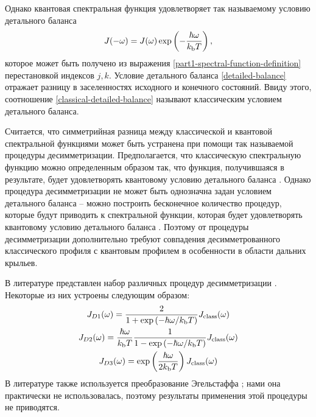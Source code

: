 Однако квантовая спектральная функция удовлетворяет так называемому условию детального баланса \cite{frommhold} 
\begin{gather}
    J(-\omega) = J(\omega) \exp \left( -\frac{\hbar \omega}{k_\text{b} T} \right), \label{detailed-balance}
\end{gather}
%
которое может быть получено из выражения \eqref{part1-spectral-function-definition} перестановкой индексов $j, k$. Условие детального баланса \eqref{detailed-balance} отражает разницу в заселенностях исходного и конечного состояний. Ввиду этого, соотношение \eqref{classical-detailed-balance} называют классическим условием детального баланса. \par
Считается, что симметрийная разница между классической и квантовой спектральной функциями может быть устранена при помощи так называемой процедуры десимметризации. Предполагается, что классическую спектральную функцию можно определенным образом  так, что функция, получившаяся в результате, будет удовлетворять квантовому условию детального баланса \cite{borysow1985phenomena}. Однако процедура десимметризации не может быть однозначна задан условием детального баланса -- можно построить бесконечное количество процедур, которые будут приводить к спектральной функции, которая будет удовлетворять квантовому условию детального баланса \cite{frommhold}. Поэтому от процедуры десимметризации дополнительно требуют совпадения десимметрованного классического профиля с квантовым профилем в особенности в области дальних крыльев. \par
В литературе представлен набор различных процедур десимметризации \cite{borysow1985}. Некоторые из них устроены следующим образом:
\begin{gather}
    J_{D1}(\omega) = \frac{2}{1 + \exp \left( -\hbar \omega / k_\text{b} T \right)} J_\text{class}(\omega)  \\
    J_{D2}(\omega) = \frac{\hbar \omega}{k_\text{b} T} \frac{1}{1 - \exp \left( -\hbar \omega / k_\text{b} T \right)} J_\text{class}(\omega) \\
    J_{D3}(\omega) = \exp \left( \frac{\hbar \omega}{2 k_\text{b} T} \right) J_\text{class}(\omega)
\end{gather}
В литературе также используется преобразование Эгельстаффа \cite{egelstaff1962}; нами она практически не использовалась, поэтому результаты применения этой процедуры не приводятся. 

